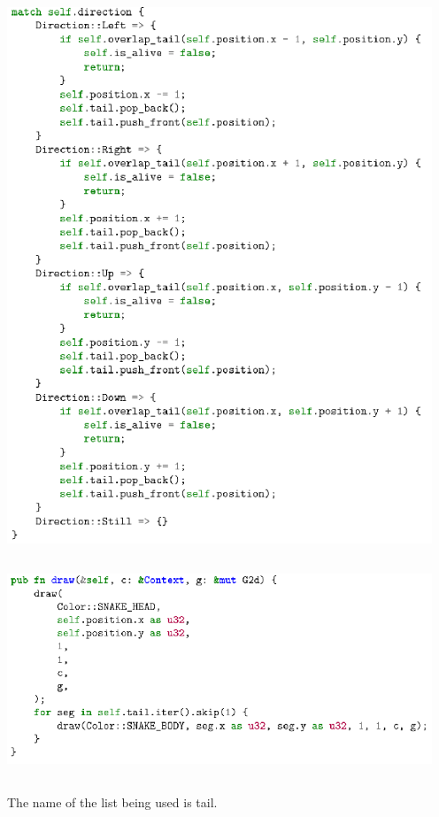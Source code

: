 \documentclass{article}
\begin{document}
\subsection{}
\includegraphics[width=5in]{3bi}
\subsection{}
\includegraphics[width=5in]{3bii}
\subsection{}
The name of the list being used is tail.
\end{document}
